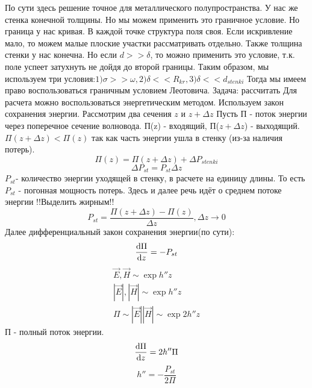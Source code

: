 \begin{enumerate}
\begin{equation}
	\end{equation}
	По сути здесь решение точное для металлического полупространства.
	У нас же стенка конечной толщины. Но мы можем применить это граничное условие.
	Но граница у нас кривая. В каждой точке структура поля своя. Если искривление мало, то можем малые плоские участки рассматривать отдельно.
	Также толщина стенки у нас конечна. Но если $d >> \delta$, то можно применить это условие, т.к. поле успеет затухнуть не дойдя до второй границы.
	Таким образом, мы используем три условия:$1) \sigma >> \omega, 2) \delta << R_{kr}, 3) \delta << d_{stenki}$
	Тогда мы имеем право воспользоваться граничным условием Леотовича.
	Задача: рассчитать 
	Для расчета можно воспользоваться энергетическим методом. Используем закон сохранения энергии.
	Рассмотрим два сечения $z$ и $z+ \Delta{z}$
	Пусть П - поток энергии через поперечное сечение волновода. 
	П(z) - входящий, П($z+ \Delta{z}$)  - выходящий.
	$\Pi(z+ \Delta{z}) < \Pi(z)$ так как часть энергии ушла в стенку (из-за наличия потерь).
	\begin{equation}
		\Pi(z) = \Pi(z+ \Delta{z}) + \Delta{P_{stenki}}
	\end{equation}
	\begin{equation}
		\Delta{P_{st}} = P_{st} \Delta{z}
	\end{equation}
	$P_{st}$- количество энергии уходящей в стенку, в расчете на единицу длины. То есть $P_{st}$ - погонная мощность потерь.
	Здесь и далее речь идёт о среднем потоке энергии !!Выделить жирным!!
	\begin{equation}
		P_{st} = \frac{\Pi(z+ \Delta{z}) - \Pi(z)}{\Delta{z}}, \Delta{z} \rightarrow 0
	\end{equation}
	Далее дифференциальный закон сохранения энергии(по сути):
	\begin{equation}
		\dv{\Pi}{z} = - P_{st}
	\end{equation}
	\begin{gather}
		\vec{E}, \vec{H} \sim \exp{h'' z}\\
		|\vec{E}|, |\vec{H}| \sim \exp{h'' z}\\
		\Pi \sim |\vec{E}| |\vec{H}| \sim \exp{2 h'' z}
	\end{gather}
	П - полный поток энергии.
	\begin{equation}
		\dv{\Pi}{z} = 2 h'' \Pi
	\end{equation}
	\begin{equation}
		h'' = - \frac{P_{st}}{ 2 \Pi}
	\end{equation}

\end{enumerate}
